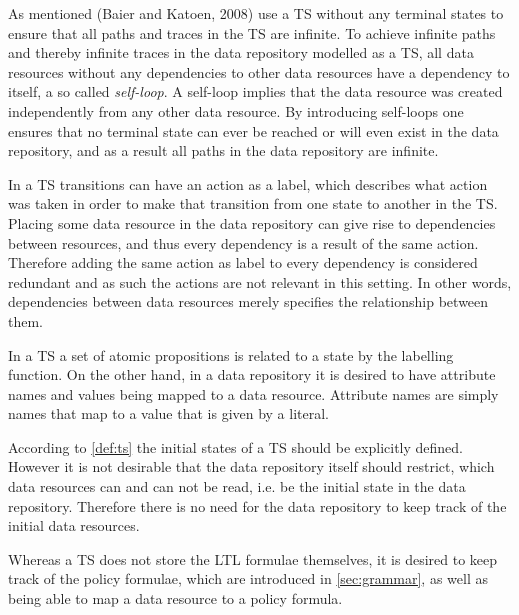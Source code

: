 As mentioned (Baier and Katoen, 2008)\cite{baier2008principles} use a TS without any terminal states to ensure that all paths and traces in the TS are infinite. To achieve infinite paths and thereby infinite traces in the data repository modelled as a TS, all data resources without any dependencies to other data resources have a dependency to itself, a so called \emph{self-loop}. A self-loop implies that the data resource was created independently from any other data resource. By introducing self-loops one ensures that no terminal state can ever be reached or will even exist in the data repository, and as a result all paths in the data repository are infinite.

In a TS transitions can have an action as a label, which describes what action was taken in order to make that transition from one state to another in the TS. Placing some data resource in the data repository can give rise to dependencies between resources, and thus every dependency is a result of the same action. Therefore adding the same action as label to every dependency is considered redundant and as such the actions are not relevant in this setting. In other words, dependencies between data resources merely specifies the relationship between them.

In a TS a set of atomic propositions is related to a state by the labelling function. On the other hand, in a data repository it is desired to have attribute names and values being mapped to a data resource. Attribute names are simply names that map to a value that is given by a literal.

According to \autoref{def:ts} the initial states of a TS should be explicitly defined. However it is not desirable that the data repository itself should restrict, which data resources can and can not be read, i.e. be the initial state in the data repository. Therefore there is no need for the data repository to keep track of the initial data resources.

Whereas a TS does not store the LTL formulae themselves, it is desired to keep track of the policy formulae, which are introduced in \autoref{sec:grammar}, as well as being able to map a data resource to a policy formula.

